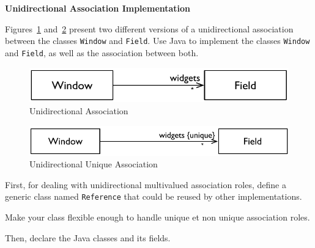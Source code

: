 \documentclass[a4paper,11pt]{memoir}
\newcommand{\code}[1]{\lstinline{#1}}
\begin{document}
\begin{question}
	\textbf{Unidirectional Association Implementation}

Figures~\ref{fig:unidirectional} and~\ref{fig:unique} present two different versions of a unidirectional association between the classes \code{Window} and \code{Field}.
Use Java to implement the classes \code{Window} and \code{Field}, as well as the association between both.

\begin{figure}[htbp]
	\centering
	\includegraphics[scale=.8]{CD-WindowFieldUni.pdf}
	\caption{Unidirectional Association}
	\label{fig:unidirectional}
\end{figure}

\begin{figure}[htbp]
	\centering
		\includegraphics[scale=.8]{CD-WindowFieldUnique.pdf}
	\caption{Unidirectional Unique Association}
	\label{fig:unique}
\end{figure}



\begin{inparaenum}[(A)]
	\item First, for dealing with unidirectional multivalued association roles, define a generic class named \code{Reference} that could be reused by other implementations.
	\item Make your class flexible enough to handle unique et non unique association roles.
	\item Then, declare the Java classes and its fields.
\end{inparaenum}

\end{question}

\begin{solution}
		\lstset{language=Java}
		
			
\end{solution}
\end{document}

